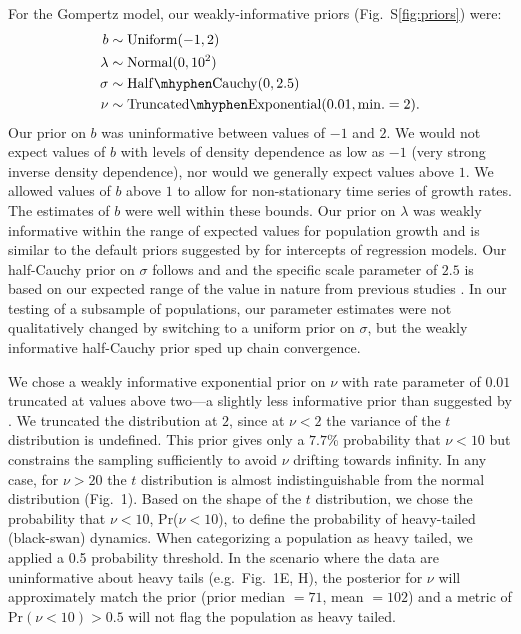 For the Gompertz model, our weakly-informative priors (Fig.~S\ref{fig:priors}) were:
\begin{align}
b &\sim \mathrm{Uniform}(-1, 2)\\ \lambda &\sim \mathrm{Normal}(0, 10^2)\\
\sigma &\sim \mathrm{Half\mhyphen Cauchy} (0, 2.5)\\ \nu &\sim
\mathrm{Truncated\mhyphen Exponential}(0.01, \mathrm{min.} = 2).
\end{align}
Our prior on \(b\) was uninformative between values of \(-1\) and \(2\). We
would not expect values of \(b\) with levels of density dependence as low as
\(-1\) (very strong inverse density dependence), nor would we generally expect
values above \(1\). We allowed values of \(b\) above \(1\) to allow for
non-stationary time series of growth rates. The estimates of \(b\) were well
within these bounds. Our prior on \(\lambda\) was weakly informative within the
range of expected values for population growth and is similar to the default
priors suggested by \citet{gelman2008d} for intercepts of
regression models. Our half-Cauchy prior on \(\sigma\) follows
\citet{gelman2006c} and \citet{gelman2008d} and the specific scale parameter of
\(2.5\) is based on our expected range of the value in nature from previous
studies \citep[e.g.][]{connors2014}. In our testing of a subsample of populations, our
parameter estimates were not qualitatively changed by switching to a uniform
prior on \(\sigma\), but the weakly informative half-Cauchy prior sped up chain
convergence.

We chose a weakly informative exponential prior on \(\nu\) with rate parameter
of \(0.01\) truncated at values above two---a slightly less informative prior
than suggested by \citet{fernandez1998}. We truncated the
distribution at \(2\), since at \(\nu < 2\) the variance of the $t$ distribution
is undefined. This prior gives only a \(7.7\)\% probability that \(\nu < 10\)
but constrains the sampling sufficiently to avoid \(\nu\) drifting towards infinity. In
any case, for \(\nu > 20\) the $t$ distribution is almost indistinguishable from
the normal distribution (Fig.~1). Based on the shape of the $t$ distribution, we
chose the probability that \(\nu < 10\), Pr(\(\nu < 10\)), to define the
probability of heavy-tailed (black-swan) dynamics. When categorizing a population as heavy
tailed, we applied a 0.5 probability threshold. In the scenario where the data
are uninformative about heavy tails (e.g.~Fig.~1E, H), the posterior for
\(\nu\) will approximately match the prior (prior median \(= 71\), mean \(=
102\)) and a metric of Pr\((\nu < 10) > 0.5\) will not flag the
population as heavy tailed.

